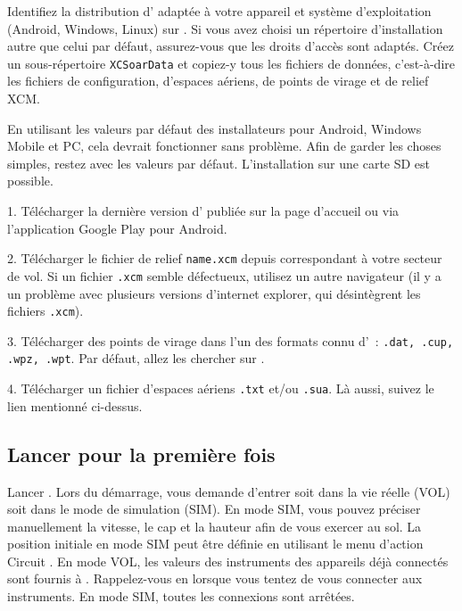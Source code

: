 \documentclass[french, a4paper, 12pt]{refrep}
\begin{document}
Identifiez la distribution d'\xc{} adaptée à votre appareil et
système d'exploitation \textsf{(Android, Windows, Linux)} 
sur .
Si vous avez choisi un répertoire d'installation autre que celui par défaut, assurez-vous que les droits
d'accès sont adaptés. Créez un sous-répertoire \texttt{XCSoarData} et copiez-y tous
les fichiers de données, c'est-à-dire les fichiers de configuration, d'espaces aériens, de points de virage et
de relief XCM.

En utilisant les valeurs par défaut des installateurs pour Android, Windows Mobile et PC, cela devrait
fonctionner sans problème. Afin de garder les choses simples, restez avec les valeurs par défaut.
L'installation sur une carte SD est possible.

\begin{compactitem}
\item[1.] Télécharger la dernière version d'\xc{} publiée sur la page d'accueil 
\xcsoarwebsite{} ou via l'application Google Play pour Android.
\item[2.] Télécharger le fichier de relief \texttt{name.xcm} depuis
correspondant à votre secteur de vol. Si un fichier \texttt{.xcm} semble
défectueux, utilisez un autre navigateur (il y a un problème avec plusieurs versions
d'internet explorer, qui désintègrent les fichiers \texttt{.xcm}).
\item[3.] Télécharger des points de virage dans l'un des formats connu d'\xc~:
\texttt{.dat, .cup, .wpz, .wpt}.  Par défaut, allez les chercher sur
.
\item[4.] Télécharger un fichier d'espaces aériens \texttt{.txt} et/ou \texttt{.sua}. Là aussi, suivez
le lien mentionné ci-dessus.
\end{compactitem}

\subsection{\textcolor{flashblue}{Lancer \xc{} pour la première fois}}
Lancer \xc. Lors du démarrage, \xc{} vous demande d'entrer soit dans la vie réelle (VOL) soit
dans le mode de simulation (SIM). En mode SIM, vous pouvez préciser manuellement la vitesse, le cap et la hauteur
afin de vous exercer au sol. La position initiale en mode SIM
peut être définie en utilisant le menu d'action Circuit .
En mode VOL, les valeurs des instruments des appareils déjà connectés sont fournis à \xc.
Rappelez-vous en lorsque vous tentez de vous connecter aux instruments. En mode SIM, toutes
les connexions sont arrêtées.
\end{document}
